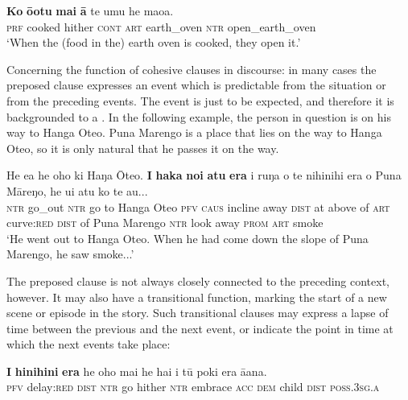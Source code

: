 \ea\label{ex:11.218}
\gll \textbf{Ko} \textbf{{\ꞌ}ō{\ꞌ}otu}{\rmfnm} \textbf{mai} \textbf{{\ꞌ}ā} te {\ꞌ}umu he ma{\ꞌ}oa.\\
\textsc{prf} cooked hither \textsc{cont} \textsc{art} earth\_oven \textsc{ntr} open\_earth\_oven\\

\glt 
‘When the (food in the) earth oven is cooked, they open it.’ \textstyleExampleref{[R372.075]} 
\z
{}

Concerning the function of cohesive clauses in discourse: in many cases the preposed clause expresses an event which is predictable from the situation or from the preceding events. The event is just to be expected, and therefore it is backgrounded to a . In the following example, the person in question is on his way to Hanga Oteo. Puna Marengo is a place that lies on the way to Hanga Oteo, so it is only natural that he passes it on the way.

\ea\label{ex:11.219}
\gll He e{\ꞌ}a he oho ki Haŋa {\ꞌ}Ōteo. \textbf{I} \textbf{haka} \textbf{noi} \textbf{atu} \textbf{era} {\ꞌ}i ruŋa o te nihinihi era o Puna Māreŋo, he u{\ꞌ}i atu ko te {\ꞌ}au... \\
\textsc{ntr} go\_out \textsc{ntr} go to Hanga Oteo \textsc{pfv} \textsc{caus} incline away \textsc{dist} at above of \textsc{art} curve:\textsc{red} \textsc{dist} of Puna Marengo \textsc{ntr} look away \textsc{prom} \textsc{art} smoke \\

\glt
‘He went out to Hanga Oteo. When he had come down the slope of Puna Marengo, he saw smoke...’ \textstyleExampleref{[R313.091]} 
\z

The preposed clause is not always closely connected to the preceding context, however. It may also have a transitional function, marking the start of a new scene or episode in the story. Such transitional clauses may express a lapse of time between the previous and the next event, or indicate the point in time at which the next events take place:

\ea\label{ex:11.220}
\gll \textbf{I} \textbf{hinihini} \textbf{era} he oho mai he ha{\ꞌ}i i tū poki era {\ꞌ}ā{\ꞌ}ana. \\
\textsc{pfv} delay:\textsc{red} \textsc{dist} \textsc{ntr} go hither \textsc{ntr} embrace \textsc{acc} \textsc{dem} child \textsc{dist} \textsc{poss.3sg.a} \\

